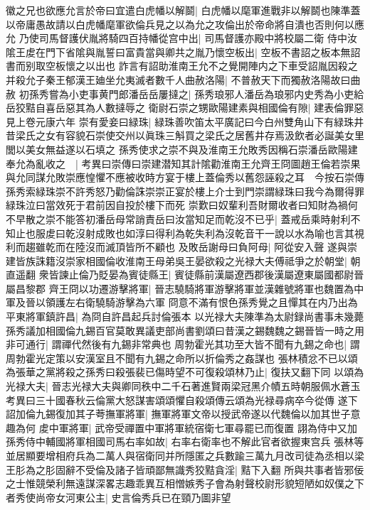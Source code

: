 徽之兄也欲應允言於帝曰宜遣白虎幡以解鬬|{
	白虎幡以麾軍進戰非以解鬬也陳準蓋以帝庸愚故請以白虎幡麾軍欲倫兵見之以為允之攻倫出於帝命將自潰也否則何以應允}
乃使司馬督護伏胤將騎四百持幡從宫中出|{
	司馬督護亦殿中將校屬二衛}
侍中汝隂王䖍在門下省隂與胤誓曰富貴當與卿共之胤乃懷空板出|{
	空板不書詔之板本無詔書而别取空板懷之以出也}
詐言有詔助淮南王允不之覺開陣内之下車受詔胤因殺之并殺允子秦王郁漢王廸坐允夷滅者數千人曲赦洛陽|{
	不普赦天下而獨赦洛陽故曰曲赦}
初孫秀嘗為小吏事黄門郎潘岳岳屢撻之|{
	孫秀琅邪人潘岳為琅邪内史秀為小吏給岳狡黠自喜岳惡其為人數撻辱之}
衛尉石崇之甥歐陽建素與相國倫有隙|{
	建表倫罪惡見上卷元康六年}
崇有愛妾曰緑珠|{
	緑珠善吹笛太平廣記曰今白州雙角山下有緑珠井昔梁氏之女有容貌石崇使交州以眞珠三斛買之梁氏之居舊井存焉汲飲者必誕美女里閭以美女無益遂以石填之}
孫秀使求之崇不與及淮南王允敗秀因稱石崇潘岳歐陽建奉允為亂收之　|{
	考異曰崇傳曰崇建潜知其計隂勸淮南王允齊王冏圖趙王倫若崇果與允同謀允敗崇應惶懼不應被收時方宴于樓上蓋倫秀以舊怨誣殺之耳　今按石崇傳孫秀索緑珠崇不許秀怒乃勸倫誅崇崇正宴於樓上介士到門崇謂緑珠曰我今為爾得罪緑珠泣曰當效死于君前因自投於樓下而死}
崇歎曰奴輩利吾財爾收者曰知財為禍何不早散之崇不能答初潘岳母常誚責岳曰汝當知足而乾沒不已乎|{
	蓋戒岳乘時射利不知止也服䖍曰乾沒射成敗也如淳曰得利為乾失利為沒乾音干一說以水為喻也言其視利而趨雖乾而在陸沒而滅頂皆所不顧也}
及敗岳謝母曰負阿母|{
	阿從安入聲}
遂與崇建皆族誅籍沒崇家相國倫收淮南王母弟吳王晏欲殺之光禄大夫傅祗爭之於朝堂|{
	朝直遥翻}
衆皆諫止倫乃貶晏為賓徒縣王|{
	賓徒縣前漢屬遼西郡後漢屬遼東屬國都尉晉屬昌黎郡}
齊王冏以功遷游擊將軍|{
	晉志驍騎將軍游擊將軍並漢雜號將軍也魏置為中軍及晉以領護左右衛驍騎游擊為六軍}
冏意不滿有恨色孫秀覺之且憚其在内乃出為平東將軍鎮許昌|{
	為冏自許昌起兵討倫張本}
以光禄大夫陳準為太尉録尚書事未幾薨　孫秀議加相國倫九錫百官莫敢異議吏部尚書劉頌曰昔漢之錫魏魏之錫晉皆一時之用非可通行|{
	謂禪代然後有九錫非常典也}
周勃霍光其功至大皆不聞有九錫之命也|{
	謂周勃霍光定策以安漢室且不聞有九錫之命所以折倫秀之姦謀也}
張林積忿不已以頌為張華之黨將殺之孫秀曰殺張裴已傷時望不可復殺頌林乃止|{
	復扶又翻下同}
以頌為光禄大夫|{
	晉志光禄大夫與卿同秩中二千石著進賢兩梁冠黑介幘五時朝服佩水蒼玉　考異曰三十國春秋云倫黨大怒謀害頌頌懼自殺頌傳云頌為光禄尋病卒今從傳}
遂下詔加倫九錫復加其子荂撫軍將軍|{
	撫軍將軍文帝以授武帝遂以代魏倫以加其世子意趣為何}
䖍中軍將軍|{
	武帝受禪置中軍將軍統宿衛七軍尋罷已而復置}
詡為侍中又加孫秀侍中輔國將軍相國司馬右率如故|{
	右率右衛率也不解此官者欲握東宫兵}
張林等並居顯要增相府兵為二萬人與宿衛同并所隱匿之兵數踰三萬九月改司徒為丞相以梁王肜為之肜固辭不受倫及諸子皆頑鄙無識秀狡黠貪淫|{
	黠下入翻}
所與共事者皆邪佞之士惟競榮利無遠謀深畧志趣乖異互相憎嫉秀子會為射聲校尉形貌短陋如奴僕之下者秀使尚帝女河東公主|{
	史言倫秀兵已在頸乃圖非望}
